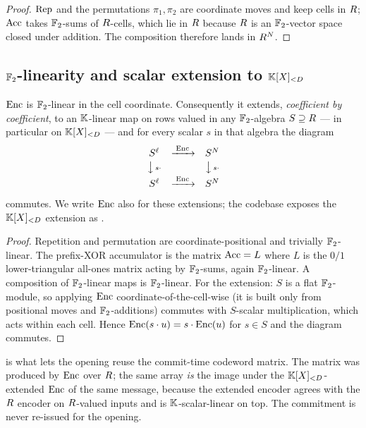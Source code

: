 \begin{proof}
$\operatorname{Rep}$ and the permutations $\pi_1,\pi_2$ are coordinate moves and keep
cells in $R$; $\operatorname{Acc}$ takes $\mathbb{F}_2$-sums of $R$-cells,
which lie in $R$ because $R$ is an $\mathbb{F}_2$-vector space
closed under addition. The composition therefore lands in
$R^{N}$.
\end{proof}

\subsection{$\mathbb{F}_2$-linearity and scalar extension to $\mathbb{K}[X]_{<D}$}

\begin{lemma}
\label{lem:linearity}
$\operatorname{Enc}$ is $\mathbb{F}_2$-linear in the cell coordinate. Consequently it extends,
\emph{coefficient by coefficient}, to an $\mathbb{K}$-linear map on rows valued
in any $\mathbb{F}_2$-algebra $S \supseteq R$ --- in particular on
$\mathbb{K}[X]_{<D}$ --- and for every scalar $s$ in that algebra the diagram
\[
  \begin{array}{ccc}
    S^{\ell} & \xrightarrow{\;\operatorname{Enc}\;} & S^{N} \\[2pt]
    \big\downarrow{\scriptstyle\, s\cdot} & & \big\downarrow{\scriptstyle\, s\cdot} \\[2pt]
    S^{\ell} & \xrightarrow{\;\operatorname{Enc}\;} & S^{N}
  \end{array}
\]
commutes. We write $\operatorname{Enc}$ also for these extensions; the codebase exposes
the $\mathbb{K}[X]_{<D}$ extension as .
\end{lemma}

\begin{proof}
Repetition and permutation are coordinate-positional and trivially
$\mathbb{F}_2$-linear. The prefix-XOR accumulator is the matrix $\operatorname{Acc} = L$ where
$L$ is the $0/1$ lower-triangular all-ones matrix acting by $\mathbb{F}_2$-sums,
again $\mathbb{F}_2$-linear. A composition of $\mathbb{F}_2$-linear maps is
$\mathbb{F}_2$-linear. For the extension: $S$ is a flat $\mathbb{F}_2$-module, so
applying $\operatorname{Enc}$ coordinate-of-the-cell-wise (it is built only from
positional moves and $\mathbb{F}_2$-additions) commutes with $S$-scalar
multiplication, which acts within each cell. Hence $\operatorname{Enc}(s\cdot u) =
s\cdot\operatorname{Enc}(u)$ for $s \in S$ and the diagram commutes.
\end{proof}

 is what lets the opening reuse the commit-time
codeword matrix. The matrix was produced by $\operatorname{Enc}$ over $R$; the
same array \emph{is} the image under the $\mathbb{K}[X]_{<D}$-extended $\operatorname{Enc}$ of the
same message, because the extended encoder agrees with the $R$
encoder on $R$-valued inputs and is $\mathbb{K}$-scalar-linear on top.
The commitment is never re-issued for the opening.

